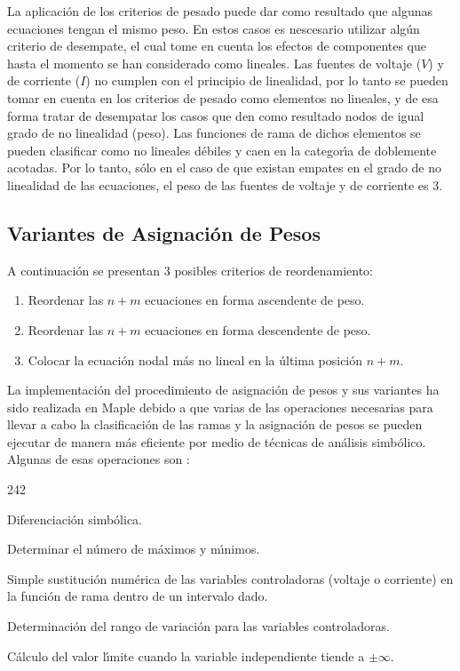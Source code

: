 \documentclass[conference,letterpaper,onecolumn]{IEEEtran}
\begin{document}
La aplicaci\'on de los criterios de pesado puede dar como
resultado que algunas ecuaciones tengan el mismo peso. En estos casos
es nescesario utilizar alg\'un criterio de desempate, el cual tome en cuenta
los efectos de componentes que hasta el momento se han considerado
como lineales. Las fuentes de voltaje ($V$) y de corriente ($I$) no cumplen con el principio
de linealidad, por lo tanto se pueden tomar en cuenta
en los criterios de pesado como elementos no lineales, y de esa forma
tratar de desempatar los casos que den como resultado nodos de igual grado de no linealidad (peso).
Las funciones de rama de dichos elementos se pueden clasificar como no
lineales d\'ebiles y caen en la categor\'{\i}a de doblemente acotadas.
Por lo tanto, s\'olo en el caso de que existan empates en el grado de
no linealidad de las ecuaciones, el peso de las fuentes de voltaje y
de corriente es 3.

\subsection{Variantes de Asignaci\'on de Pesos}

A continuaci\'on se presentan 3 posibles criterios de reordenamiento:
\begin{enumerate}
\item Reordenar las $n+m$ ecuaciones en forma ascendente de peso.
\item Reordenar las $n+m$ ecuaciones en forma descendente de peso.
\item Colocar la ecuaci\'on nodal m\'as no lineal en la \'ultima posici\'on $n+m$.
\end{enumerate}

La implementaci\'on del procedimiento de asignaci\'on de pesos y sus
va\-rian\-tes ha sido realizada en Maple \cite{maple1} debido a que varias de las operaciones
necesarias para llevar a cabo la clasificaci\'on de las ramas y la
asignaci\'on de pesos se pueden ejecutar de manera m\'as eficiente por
medio de t\'ecnicas de an\'alisis simb\'olico.
Algunas de esas operaciones son \cite{homo_SMACD,homo_ECCTD}:
\begin{dinglist}{242}
\item Diferenciaci\'on simb\'olica.
\item Determinar el n\'umero de m\'aximos y m\'{\i}nimos.
\item Simple sustituci\'on num\'erica de las variables controladoras
(voltaje o corriente) en la funci\'on de rama dentro de un intervalo dado. 
\item Determinaci\'on del rango de variaci\'on para las variables controladoras.
\item C\'alculo del valor l\'{\i}mite cuando la variable independiente tiende a
      $\pm\infty$.
\end{dinglist}  
\end{document}
